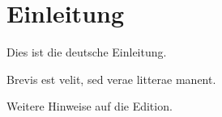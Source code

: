 \chapter{Einleitung}
Dies ist die deutsche Einleitung.

Brevis est velit, sed verae litterae manent.

Weitere Hinweise auf die Edition.